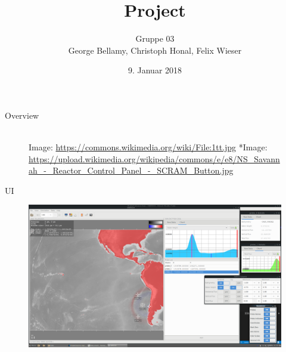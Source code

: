 \documentclass[shortpres,usenames,dvipsnames]{beamer}
\title[{Tsunami simulation}]{Project}
\author[Bellamy, Honal, Wieser]{Gruppe 03\\George Bellamy, Christoph Honal, Felix Wieser\\\vspace{10pt}{\small Bachelorpraktikum}}
\institute[TU M\"unchen]{Technical University of Munich}
\date{9. Januar 2018}
\begin{document}
		\maketitle
		
		
\begin{frame}{Overview}
	\begin{figure}
		\hspace{20pt}
		\hspace{40pt}\vspace{10pt}\\
		\vfill
		\flushleft
		{\fontsize{5}{5} \selectfont *Image: \url{https://commons.wikimedia.org/wiki/File:1tt.jpg}}
		\flushleft
		{\fontsize{5}{5} \selectfont **Image: \url{https://upload.wikimedia.org/wikipedia/commons/e/e8/NS_Savannah_-_Reactor_Control_Panel_-_SCRAM_Button.jpg}}
	\end{figure}
\end{frame}

\begin{frame}[fragile]{UI}
	\begin{figure}
		\includegraphics[clip, width=\linewidth]{img/screenshot_1.png}
	\end{figure}
\end{frame}
\end{document}
